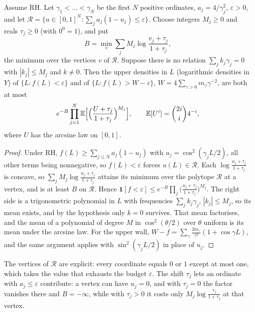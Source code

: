 \begin{theorem}\label{bo:thm:walls}
Assume RH. Let $\gamma_1<\dots<\gamma_N$ be the first $N$ positive ordinates, $a_j=4/\gamma_j^2$, $\varepsilon>0$, and let $\mathcal R=\{u\in[0,1]^N:\sum_ja_j(1-u_j)\le\varepsilon\}$. Choose integers $M_j\ge0$ and reals $\tau_j\ge0$ (with $0^0=1$), and put
\[
B=\min_{v}\sum_{j}M_j\log\frac{v_j+\tau_j}{1+\tau_j},
\]
the minimum over the vertices $v$ of $\mathcal R$. Suppose there is no relation $\sum_jk_j\gamma_j=0$ with $|k_j|\le M_j$ and $k\ne0$. Then the upper densities in $L$ (logarithmic densities in $Y$) of $\{L:f(L)<\varepsilon\}$ and of $\{L:f(L)>W-\varepsilon\}$, $W=4\sum_{\gamma>0}m_\gamma\gamma^{-2}$, are both at most
\[
e^{-B}\prod_{j=1}^N\mathbb E\Bigl[\Bigl(\frac{U+\tau_j}{1+\tau_j}\Bigr)^{M_j}\Bigr],\qquad \mathbb E[U^i]=\binom{2i}{i}4^{-i},
\]
where $U$ has the arcsine law on $[0,1]$.
\end{theorem}

\begin{proof}
Under RH, $f(L)\ge\sum_{j\le N}a_j(1-u_j)$ with $u_j=\cos^2(\gamma_jL/2)$, all other terms being nonnegative, so $f(L)<\varepsilon$ forces $u(L)\in\mathcal R$. Each $\log\frac{u_j+\tau_j}{1+\tau_j}$ is concave, so $\sum_jM_j\log\frac{u_j+\tau_j}{1+\tau_j}$ attains its minimum over the polytope $\mathcal R$ at a vertex, and is at least $B$ on $\mathcal R$. Hence $\mathbf 1[f<\varepsilon]\le e^{-B}\prod_j\bigl(\frac{u_j+\tau_j}{1+\tau_j}\bigr)^{M_j}$. The right side is a trigonometric polynomial in $L$ with frequencies $\sum_jk_j\gamma_j$, $|k_j|\le M_j$, so its mean exists, and by the hypothesis only $k=0$ survives. That mean factorises, and the mean of a polynomial of degree $M$ in $\cos^2(\theta/2)$ over $\theta$ uniform is its mean under the arcsine law. For the upper wall, $W-f=\sum_\gamma\frac{2m_\gamma}{\gamma^2}(1+\cos\gamma L)$, and the same argument applies with $\sin^2(\gamma_jL/2)$ in place of $u_j$.
\end{proof}

The vertices of $\mathcal R$ are explicit: every coordinate equals $0$ or $1$ except at most one, which takes the value that exhausts the budget $\varepsilon$. The shift $\tau_j$ lets an ordinate with $a_j\le\varepsilon$ contribute: a vertex can have $u_j=0$, and with $\tau_j=0$ the factor vanishes there and $B=-\infty$, while with $\tau_j>0$ it costs only $M_j\log\frac{\tau_j}{1+\tau_j}$ at that vertex.

